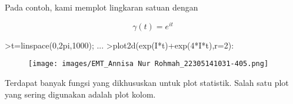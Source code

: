 \documentclass[a4paper,10pt]{article}
\begin{document}
\begin{eulernotebook}
\begin{eulercomment}
Pada contoh, kami memplot lingkaran satuan dengan

\end{eulercomment}
\begin{eulerformula}
\[
\gamma(t) = e^{it}
\]
\end{eulerformula}
\begin{eulerprompt}
>t=linspace(0,2pi,1000); ...
>plot2d(exp(I*t)+exp(4*I*t),r=2):
\end{eulerprompt}
\begin{figure}[h]
    \centering
    \texttt{[image: images/EMT\_Annisa Nur Rohmah\_22305141031-405.png]}
\end{figure}
\begin{eulercomment}
Terdapat banyak fungsi yang dikhususkan untuk plot statistik. Salah
satu plot yang sering digunakan adalah plot kolom.


\end{eulercomment}
\end{eulernotebook}
\end{document}
